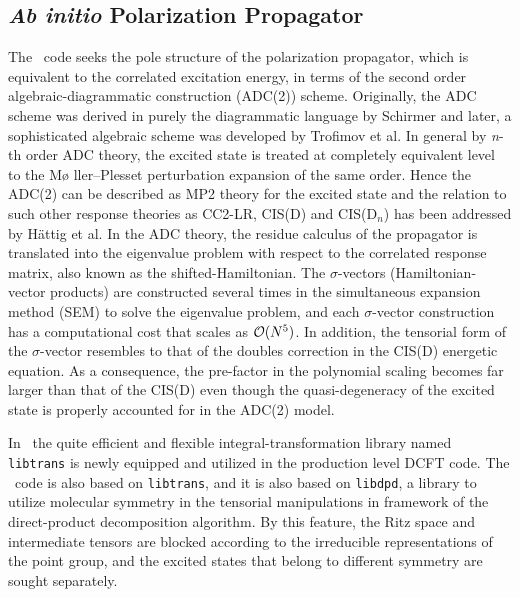 \subsection{\textit{Ab initio} Polarization Propagator} \label{adc}
\renewcommand{\optionname}[2]{\texttt{\nameref{op-#2-#1}}}

The \PSIadc\ code seeks the pole structure of the polarization
propagator, which is equivalent to the correlated excitation energy,
in terms of the second order algebraic-diagrammatic construction
(ADC(2)) scheme.  Originally, the ADC scheme was derived in purely
the diagrammatic language by Schirmer \cite{Schirmer:1982} and later,
a sophisticated algebraic scheme was developed \cite{Trofimov:2006}
by Trofimov et al. In general by \textit{n}-th order ADC theory, the
excited state is treated at completely equivalent level to the M\o
ller--Plesset perturbation expansion of the same order. Hence the ADC(2)
can be described as MP2 theory for the excited state and the relation
to such other response theories as CC2-LR, CIS(D) and CIS(D${}_n$) has
been addressed \cite{Haettig:2002} by H\"attig et al.  In the ADC theory,
the residue calculus of the propagator is translated into the eigenvalue
problem with respect to the correlated response matrix, also known as the
shifted-Hamiltonian. The $\sigma$-vectors (Hamiltonian-vector products)
are constructed several times in the simultaneous expansion method (SEM)
to solve the eigenvalue problem, and each $\sigma$-vector construction
has a computational cost that scales as ${\cal{O}}(N^5)$. In addition,
the tensorial form of the $\sigma$-vector resembles to that of the
doubles correction in the CIS(D) energetic equation. As a consequence,
the pre-factor in the polynomial scaling becomes far larger than that
of the CIS(D) even though the quasi-degeneracy of the excited state is
properly accounted for in the ADC(2) model.

In \PSIfour\ the quite efficient and flexible integral-transformation
library named {\tt libtrans} is newly equipped and utilized in the
production level DCFT code. The \PSIadc\ code is also based on
{\tt libtrans}, and it is also based on {\tt libdpd}, a library to
utilize molecular symmetry in the tensorial manipulations in framework
of the direct-product decomposition algorithm. By this feature, the Ritz
space and intermediate tensors are blocked according to the irreducible
representations of the point group, and the excited states that belong
to different symmetry are sought separately.

